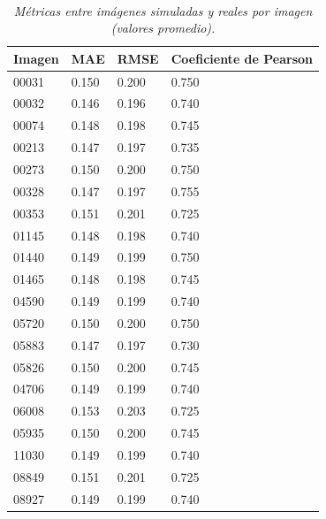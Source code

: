             \begin{table}[H]
                \caption{\doublespacing \\ \textit{Métricas entre imágenes simuladas y reales por imagen (valores promedio).}}
                \begin{spacing}{8}
                    \fontsize{8pt}{2pt}\selectfont  
                    \begin{tabularx}{\linewidth}{*{4}{X}} 
                        \toprule
                        \textbf{Imagen} & \textbf{MAE} & \textbf{RMSE} & \textbf{Coeficiente de Pearson} \\ 
                        \midrule
                        00031 & 0.150 & 0.200 & 0.750 \\ 
                        00032 & 0.146 & 0.196 & 0.740 \\ 
                        00074 & 0.148 & 0.198 & 0.745 \\
                        00213 & 0.147 & 0.197 & 0.735 \\ 
                        00273 & 0.150 & 0.200 & 0.750 \\
                        00328 & 0.147 & 0.197 & 0.755 \\ 
                        00353 & 0.151 & 0.201 & 0.725 \\ 
                        01145 & 0.148 & 0.198 & 0.740 \\
                        01440 & 0.149 & 0.199 & 0.750 \\ 
                        01465 & 0.148 & 0.198 & 0.745 \\ 
                        04590 & 0.149 & 0.199 & 0.740 \\ 
                        05720 & 0.150 & 0.200 & 0.750 \\ 
                        05883 & 0.147 & 0.197 & 0.730 \\ 
                        05826 & 0.150 & 0.200 & 0.745 \\ 
                        04706 & 0.149 & 0.199 & 0.740 \\ 
                        06008 & 0.153 & 0.203 & 0.725 \\ 
                        05935 & 0.150 & 0.200 & 0.745 \\ 
                        11030 & 0.149 & 0.199 & 0.740 \\ 
                        08849 & 0.151 & 0.201 & 0.725 \\ 
                        08927 & 0.149 & 0.199 & 0.740 \\ 

\end{tabularx}
\end{spacing}
\end{table}

